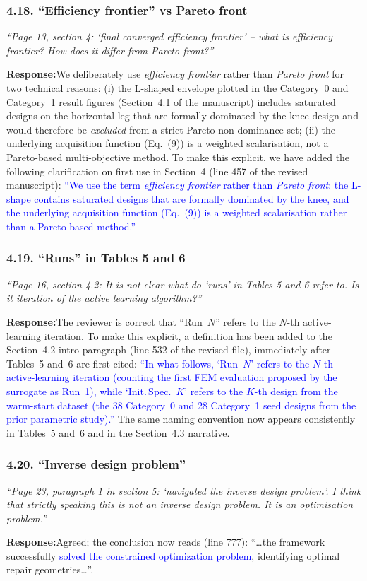 \documentclass[11pt,a4paper]{article}
\newcommand{\new}[1]{\textcolor{blue}{#1}}
\newcommand{\rev}[1]{\par\noindent\textit{\small #1}\par\smallskip}
\newcommand{\resp}{\par\noindent\textbf{Response:}\space}
\begin{document}
\subsubsection*{4.18. ``Efficiency frontier'' vs Pareto front}
\rev{``Page 13, section 4: `final converged efficiency frontier' -- what is efficiency frontier? How does it differ from Pareto front?''}
\resp We deliberately use \emph{efficiency frontier} rather than \emph{Pareto front} for two technical reasons: (i) the L-shaped envelope plotted in the Category~0 and Category~1 result figures (Section~4.1 of the manuscript) includes saturated designs on the horizontal leg that are formally dominated by the knee design and would therefore be \emph{excluded} from a strict Pareto-non-dominance set; (ii) the underlying acquisition function (Eq.~(9)) is a weighted scalarisation, not a Pareto-based multi-objective method. To make this explicit, we have added the following clarification on first use in Section~4 (line 457 of the revised manuscript): \new{``We use the term \emph{efficiency frontier} rather than \emph{Pareto front}: the L-shape contains saturated designs that are formally dominated by the knee, and the underlying acquisition function (Eq.~(9)) is a weighted scalarisation rather than a Pareto-based method.''}

\subsubsection*{4.19. ``Runs'' in Tables 5 and 6}
\rev{``Page 16, section 4.2: It is not clear what do `runs' in Tables 5 and 6 refer to. Is it iteration of the active learning algorithm?''}
\resp The reviewer is correct that ``Run~$N$'' refers to the $N$-th active-learning iteration. To make this explicit, a definition has been added to the Section~4.2 intro paragraph (line 532 of the revised file), immediately after Tables~5 and~6 are first cited: \new{``In what follows, `Run~$N$' refers to the $N$-th active-learning iteration (counting the first FEM evaluation proposed by the surrogate as Run~1), while `Init.\,Spec.~$K$' refers to the $K$-th design from the warm-start dataset (the 38 Category~0 and 28 Category~1 seed designs from the prior parametric study).''} The same naming convention now appears consistently in Tables~5 and~6 and in the Section~4.3 narrative.

\subsubsection*{4.20. ``Inverse design problem''}
\rev{``Page 23, paragraph 1 in section 5: `navigated the inverse design problem'. I think that strictly speaking this is not an inverse design problem. It is an optimisation problem.''}
\resp Agreed; the conclusion now reads (line 777): ``\ldots the framework successfully \new{solved the constrained optimization problem}, identifying optimal repair geometries\ldots''.
\end{document}
